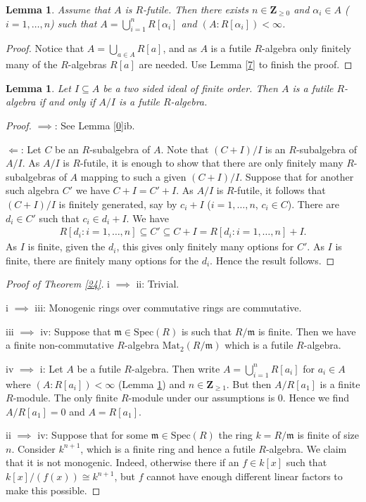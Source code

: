 \documentclass{amsart}
\theoremstyle{plain}
\newtheorem{lemma}[theorem]{Lemma}
\theoremstyle{definition}
\begin{document}
\begin{lemma} \label{1}
 Assume that $A$ is $R$-futile. Then there exists $n \in {\mathbf{Z}}_{\geq 0}$ and $\alpha_i \in A$ ($i=1,\ldots,n$) such that $A= \bigcup_{i=1}^n
R[\alpha_i]$ and $(A:R[\alpha_i])<\infty$. 
\end{lemma}
\begin{proof}
 Notice that $A=\bigcup_{a \in A} R[a]$, and as $A$ is a futile $R$-algebra only finitely many of the $R$-algebras $R[a]$ are needed. Use Lemma
\ref{7} to
finish the proof. 
\end{proof}

\begin{lemma} \label{17}
Let $I \subseteq A$ be a two sided ideal of finite order. Then $A$ is a futile $R$-algebra if and only if $A/I$
is a futile $R$-algebra. 
\end{lemma}
\begin{proof}
 $\implies$: See Lemma \ref{0}ib. 

${\Longleftarrow}$: Let $C$ be an
$R$-subalgebra of $A$. Note that $(C+I)/I$ is an $R$-subalgebra of $A/I$. As $A/I$ is $R$-futile, it is enough to show that there are only finitely
many $R$-subalgebras of $A$ mapping to such a given $(C+I)/I$.
Suppose that for another such algebra $C'$ we have $C+I=C'+I$. As $A/I$ is $R$-futile, it follows that $(C+I)/I$ is finitely generated, say by $c_i+I$
($i=1,\ldots,n$, $c_i \in C$). There are $d_i \in C'$ such that $c_i \in d_i+I$. We have
\begin{eqnarray*}
R[d_i: i=1,\ldots,n] \subseteq C' \subseteq C+I=R[d_i: i=1,\ldots,n]+I.
\end{eqnarray*}
As $I$ is finite, given the $d_i$, this gives only finitely many options for $C'$. As $I$ is finite, there are finitely many options for the
$d_i$. Hence the result follows.
\end{proof}

\begin{proof}[Proof of Theorem \ref{24}]
i $\implies$ ii: Trivial.

i $\implies$ iii: Monogenic rings over commutative rings are commutative.

iii $\implies$ iv: Suppose that ${\mathfrak{m}} \in \mathrm{Spec}(R)$ is such that $R/{\mathfrak{m}}$ is finite. Then we have a finite non-commutative $R$-algebra
$\mathrm{Mat}_2(R/{\mathfrak{m}})$ which is a futile $R$-algebra.

iv $\implies$ i: Let $A$ be a futile $R$-algebra. Then write $A= \bigcup_{i=1}^n R[a_i]$ for $a_i \in A$
where
$(A:R[a_i])<\infty$ (Lemma \ref{1}) and $n \in {\mathbf{Z}}_{\geq 1}$. But then $A/R[a_1]$ is a finite $R$-module. The only finite $R$-module under our
assumptions is $0$. Hence we find $A/R[a_1]=0$ and $A=R[a_1]$. 

ii $\implies$ iv: Suppose that for some ${\mathfrak{m}} \in \mathrm{Spec}(R)$ the ring $k=R/{\mathfrak{m}}$ is finite of size $n$. Consider $k^{n+1}$, which is a finite
ring and hence a futile $R$-algebra. We claim that it is not monogenic. Indeed, otherwise there if an $f \in k[x]$ such that $k[x]/(f(x))
\cong k^{n+1}$, but $f$ cannot have
enough different linear factors to make this possible. 
\end{proof}
\end{document}

